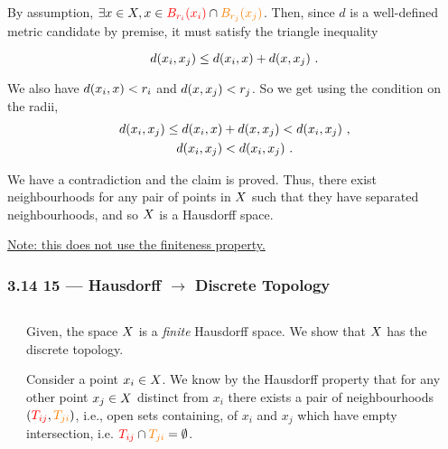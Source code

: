 \begin{frame}    
    By assumption, \(\exists x \in X, x \in \textcolor{red}{B_{r_i}(x_i)}
    \cap \textcolor{orange}{B_{r_j}(x_j)}\). Then, since \(d\) is a well-defined
    metric candidate by premise, it must satisfy the triangle inequality

    \begin{equation*}
        d(x_i, x_j) \leq d(x_i, x) + d(x, x_j)~.
    \end{equation*}

    We also have \(d(x_i, x) < r_i\) and \(d(x, x_j) <
    r_j\). So we get using the condition on the radii,
    \begin{gather*}
        d(x_i, x_j) \leq d(x_i, x) + d(x, x_j) < d(x_i, x_j)~,\\
        d(x_i, x_j) < d(x_i, x_j)~.
    \end{gather*}

    We have a contradiction and the claim is proved. Thus, there exist
    neighbourhoods for any pair of points in \(X\) such that they have
    separated neighbourhoods, and so \(X\) is a Hausdorff space.

    \underline{Note: this does not use the finiteness property.}
\end{frame}

\begin{frame}
    \frametitle{3.14 15 --- Hausdorff \(\rightarrow\) Discrete Topology}

    \begin{columns}
        \begin{column}{0.3\textwidth}
            \scalebox{0.6}{}            
        \end{column}
        \begin{column}{0.7\textwidth}
            Given, the space \(X\) is a \emph{finite} Hausdorff space. We
            show that \(X\) has the discrete topology.

            Consider a point \(x_i \in X\). We know by the Hausdorff
            property that for any other point \(x_j \in X\) distinct from
            \(x_i\) there exists a pair of neighbourhoods
            \((\textcolor{red}{T_{ij}}, \textcolor{orange}{T_{ji}})\), i.e.,
            open sets containing, of \(x_i\) and \(x_j\) which have empty
            intersection, i.e. \(\textcolor{red}{T_{ij}} \cap
            \textcolor{orange}{T_{ji}} = \emptyset\).
        \end{column}
    \end{columns}   

\end{frame}

